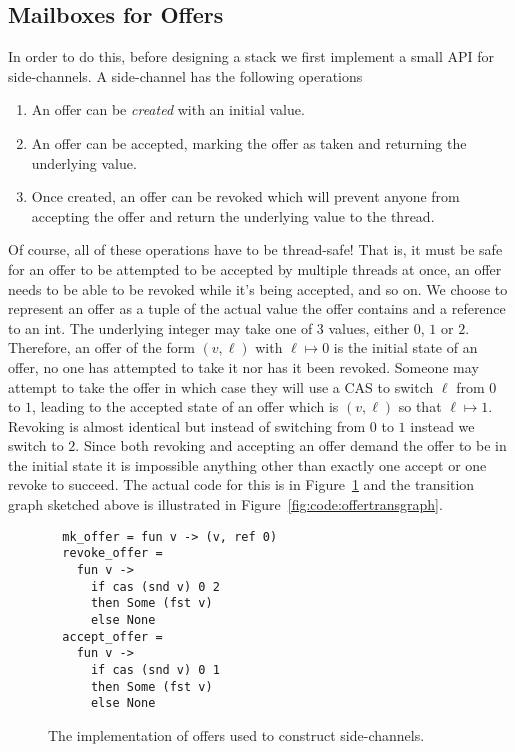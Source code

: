 \subsection{Mailboxes for Offers}
In order to do this, before designing a stack we first implement a
small API for side-channels. A side-channel has the following
operations
\begin{enumerate}
\item An offer can be \emph{created} with an initial value.
\item An offer can be accepted, marking the offer as taken and
  returning the underlying value.
\item Once created, an offer can be revoked which will prevent anyone
  from accepting the offer and return the underlying value to the
  thread.
\end{enumerate}
Of course, all of these operations have to be thread-safe! That is, it
must be safe for an offer to be attempted to be accepted by multiple
threads at once, an offer needs to be able to be revoked while it's
being accepted, and so on. We choose to represent an offer as a tuple
of the actual value the offer contains and a reference to an int. The
underlying integer may take one of 3 values, either $0$, $1$ or
$2$. Therefore, an offer of the form $(v, \ell)$ with $\ell \mapsto 0$
is the initial state of an offer, no one has attempted to take it nor
has it been revoked. Someone may attempt to take the offer in which
case they will use a CAS to switch $\ell$ from $0$ to $1$, leading to
the accepted state of an offer which is $(v, \ell)$ so that
$\ell \mapsto 1$.  Revoking is almost identical but instead of
switching from $0$ to $1$ instead we switch to $2$. Since both
revoking and accepting an offer demand the offer to be in the initial
state it is impossible anything other than exactly one accept or one
revoke to succeed. The actual code for this is in
Figure~\ref{fig:code:offer} and the transition graph sketched above is
illustrated in Figure~\ref{fig:code:offertransgraph}.
\begin{figure}
\begin{lstlisting}
  mk_offer = fun v -> (v, ref 0)
  revoke_offer =
    fun v ->
      if cas (snd v) 0 2
      then Some (fst v)
      else None
  accept_offer =
    fun v ->
      if cas (snd v) 0 1
      then Some (fst v)
      else None
\end{lstlisting}
\caption{The implementation of offers used to construct side-channels.}
\label{fig:code:offer}
\end{figure}
